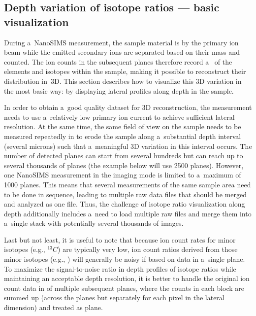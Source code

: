 \subsection{Depth variation of isotope ratios --- basic visualization}
\setcounter{step}{0}

\goldbox{}
During a~NanoSIMS measurement, the sample material is  by the primary ion beam while the emitted secondary ions are separated based on their mass and counted. The ion counts in the subsequent planes therefore record a~ of the elements and isotopes within the sample, making it possible to reconstruct their distribution in~3D. This section describes how to visualize this 3D variation in the most basic way: by displaying lateral profiles along depth in the sample.
\tcbe

In order to obtain a~good quality dataset for 3D reconstruction, the measurement needs to use a~relatively low primary ion current to achieve sufficient lateral resolution. At the same time, the same field of view on the sample needs to be measured repeatedly in  to erode the sample along a~substantial depth interval (several microns) such that a~meaningful 3D variation in this interval occurs. The number of detected planes can start from several hundreds but can reach up to several thousands of planes (the example below will use 2500 planes). However, one NanoSIMS measurement in the imaging mode is limited to a~maximum of 1000 planes. This means that several measurements of the same sample area need to be done in sequence, leading to multiple raw data files that should be merged and analyzed as one file. Thus, the challenge of isotope ratio visualization along depth additionally includes a~need to load multiple raw files and merge them into a~single stack with potentially several thousands of images. 

Last but not least, it is useful to note that because ion count rates for minor isotopes (e.g., ${}^{13}C$) are typically very low, ion count ratios derived from those minor isotopes (e.g., ) will generally be noisy if based on data in a~single plane. To maximize the signal-to-noise ratio in depth profiles of isotope ratios while maintaining an acceptable depth resolution, it is better to handle the original ion count data in  of multiple subsequent planes, where the counts in each block are summed up (across the planes but separately for each pixel in the lateral dimension) and treated as  plane.  

